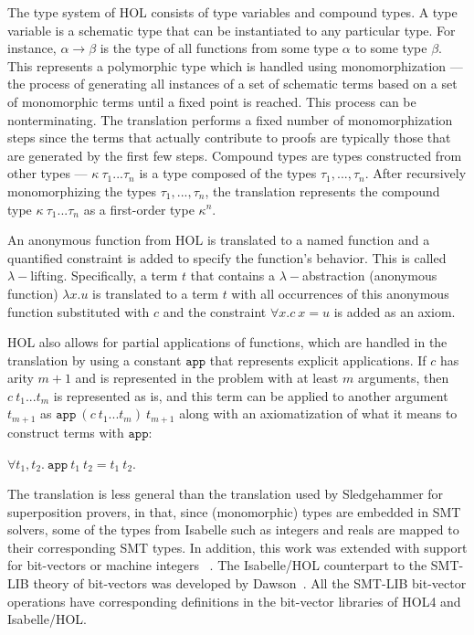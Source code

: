 \documentclass{article}
\begin{document}
		The type system of HOL consists 
		of type variables and compound types.
		A type variable is a schematic type that 
		can be instantiated to any particular type.
		For instance, $\alpha \to \beta$ is the type
		of all functions from some type $\alpha$ to
		some type $\beta$. This represents a 
		polymorphic type which is handled using 
		monomorphization --- the process of generating
		all instances of a set of schematic terms based 
		on a set of monomorphic terms until a fixed point
		is reached. This process can be nonterminating. 
		The translation performs a fixed number of 
		monomorphization steps since the terms that 
		actually contribute to proofs are 
		typically those that are generated by the 
		first few steps. Compound types 
		are types constructed from other types --- 
		$\kappa\ \tau_1 ... \tau_n$ is a type composed of 
		the types $\tau_1, ..., \tau_n$. After 
		recursively monomorphizing the types 
		$\tau_1, ..., \tau_n$, the translation 
		represents the compound type 
		$\kappa\ \tau_1 ... \tau_n$ as a first-order 
		type $\kappa^n$.
		
		An anonymous function from HOL is translated 
		to a named function and a quantified constraint
		is added to specify the function's behavior.
		This is called $\lambda-$lifting.
		Specifically, a term $t$ that contains a $\lambda-$abstraction
		(anonymous function) $\lambda x.u$ is translated 
		to a term $t$ with all occurrences of this 
		anonymous function substituted with $c$ and 
		the constraint $\forall x. c\ x = u$ is added 
		as an axiom.

		HOL also allows for partial applications of 
		functions, which are handled in the translation
		by using a constant $\texttt{app}$ that 
		represents explicit applications. If $c$ has 
		arity $m+1$ and is represented in the problem 
		with at least $m$ arguments, then 
		$c\ t_1 ... t_m$ is represented as is, 
		and this term can be applied to another 
		argument $t_{m+1}$ as 
		$\texttt{app}\ (c\ t_1 ... t_m)\ t_{m+1}$ along 
		with an axiomatization of what it means 
		to construct terms with $\texttt{app}$: 
		\begin{center}
			$\forall t_1, t_2.\ \texttt{app}\ t_1\ t_2 
			= t_1\  t_2$.
		\end{center}
		
		The translation is less general than the 
		translation used by Sledgehammer for 
		superposition provers, in that, since 
		(monomorphic) types are embedded in SMT solvers, 
		some of the types from Isabelle such as integers 
		and reals are mapped to their corresponding SMT 
		types. In addition, this work was extended with 
		support for bit-vectors or machine integers
		~\cite{10.1007/978-3-642-25379-9_15}. The 
		Isabelle/HOL counterpart to the SMT-LIB 
		theory of bit-vectors was developed by 
		Dawson~\cite{DAWSON200955}. All the SMT-LIB
		bit-vector operations have corresponding 
		definitions in the bit-vector libraries of 
		HOL4 and Isabelle/HOL.
		
\end{document}
